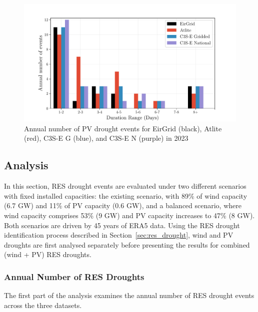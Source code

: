 \documentclass[a4paper, 11pt]{article}
\begin{document}
\begin{figure}[!ht]
	\centering
	\includegraphics[width=\textwidth]{verification_pv_bar}
	\caption{Annual number of PV drought events for EirGrid (black), Atlite (red), C3S-E G (blue), and C3S-E N (purple) in 2023}
	\label{fig:bar_number_events_verification_pv}
\end{figure}

\newpage
\subsection{Analysis}
\label{sec:Analysis}

In this section, RES drought events are evaluated under two different scenarios with fixed installed capacities: the existing scenario, with 89\% of wind capacity (6.7 GW) and 11\% of PV capacity (0.6 GW), and a balanced scenario, where wind capacity comprises 53\% (9 GW) and PV capacity increases to 47\% (8 GW). Both scenarios are driven by 45 years of ERA5 data. Using the RES drought identification process described in Section~\ref{sec:res_drought}, wind and PV droughts are first analysed separately before presenting the results for combined (wind + PV) RES droughts.

\subsubsection{Annual Number of RES Droughts}

The first part of the analysis examines the annual number of RES drought events across the three datasets. 
\end{document}

